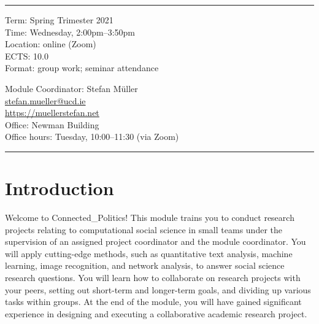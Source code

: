 \documentclass[abstract=on,parskip=full,headings=standardclasses,fontsize=11pt,paper=a4]{scrartcl}
\begin{document}
\vspace{1.5cm}



\hrule
\medskip
\begin{minipage}[t]{0.5\textwidth}
Term: Spring Trimester 2021 \\
Time: Wednesday, 2:00pm--3:50pm \\
Location:  online (Zoom) \\ %
ECTS: 10.0 \\
Format: group work; seminar attendance
\end{minipage}
\begin{minipage}[t]{0.49\textwidth}
\begin{flushright}
Module Coordinator: Stefan Müller \\
 \href{mailto:stefan.mueller@ucd.ie}{\textsf{stefan.mueller@ucd.ie}} \\
 \url{https://muellerstefan.net} \\
Office:  Newman Building \\
Office hours: Tuesday, 10:00--11:30 (via Zoom)
\end{flushright}
\end{minipage}
\medskip
\hrule 

\section*{Introduction}


Welcome to Connected\_Politics! This module trains you to conduct research projects relating to computational social science in small teams under the supervision of an assigned project coordinator and the module coordinator. You will apply cutting-edge methods, such as quantitative text analysis, machine learning, image recognition, and network analysis, to answer social science research questions. You will learn how to collaborate on research projects with your peers, setting out short-term and longer-term goals, and dividing up various tasks within  groups. At the end of the module, you will have gained significant experience in designing and executing a collaborative academic research project.
\end{document}
